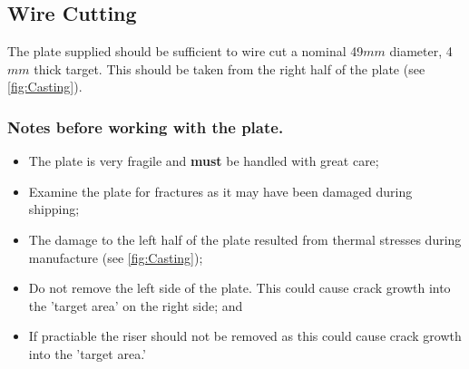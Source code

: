 \subsection{Wire Cutting}
The \MgZnCa plate supplied should be sufficient to wire cut a nominal 49$mm$ diameter, 4$mm$ thick target. This should be taken from the right half of the plate (see \ref{fig:Casting}). 

\subsubsection{Notes before working with the plate.}
\begin{itemize}
\item The \MgZnCa plate is very fragile and \textbf{must} be handled with great care; 
\item Examine the plate for fractures as it may have been damaged during shipping; 
\item The damage to the left half of the plate resulted from thermal stresses during manufacture (see \ref{fig:Casting});
\item Do not remove the left side of the plate. This could cause crack growth into the 'target area' on the right side; and
\item If practiable the riser should not be removed as this could cause crack growth into the 'target area.'
\end{itemize}